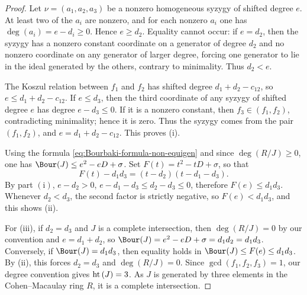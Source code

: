 \documentclass[11pt]{amsart} %
\theoremstyle{definition}
\def\hht{{\rm ht}\,}
\def\hht{{\rm ht}\,}
\begin{document}
\begin{proof}
Let $\nu=(a_1,a_2,a_3)$ be a nonzero homogeneous syzygy of shifted degree $e$. At least two of the $a_i$ are nonzero, and for each nonzero $a_i$ one has $\deg(a_i)=e-d_i\ge0$. Hence $e\ge d_2$. Equality cannot occur: if $e=d_2$, then the syzygy has a nonzero constant coordinate on a generator of degree $d_2$ and no nonzero coordinate on any generator of larger degree, forcing one generator to lie in the ideal generated by the others, contrary to minimality. Thus $d_2<e$.

The Koszul relation between $f_1$ and $f_2$ has shifted degree $d_1+d_2-c_{12}$, so $e\le d_1+d_2-c_{12}$. If $e\le d_3$, then the third coordinate of any syzygy of shifted degree $e$ has degree $e-d_3\le0$. If it is a nonzero constant, then $f_3\in(f_1,f_2)$, contradicting minimality; hence it is zero. Thus the syzygy comes from the pair $(f_1,f_2)$, and $e=d_1+d_2-c_{12}$. This proves \rm(i).

Using the formula \eqref{eq:Bourbaki-formula-non-equigen} and since $\deg(R/J)\ge0$, one has $\Bour(J)\le e^2-eD+\sigma$. Set $F(t)=t^2-tD+\sigma$, so that
$$
F(t) - d_1 d_3 = (t-d_2)(t-d_1-d_3).
$$
By part $\mathrm{(i)}$, $e-d_2 > 0$, $e-d_1-d_3 \leq d_2 - d_3 \leq 0$, therefore $F(e) \leq d_1d_3$. Whenever $d_2 < d_3$, the second factor is strictly negative, so $F(e) < d_1 d_3$, and this shows \rm(ii).

For \rm(iii), if $d_2=d_3$ and $J$ is a complete intersection, then $\deg(R/J)=0$ by our convention and $e=d_1+d_2$, so $\Bour(J)=e^2-eD+\sigma=d_1d_2=d_1d_3$. Conversely, if $\Bour(J)=d_1d_3$, then equality holds in $\Bour(J)\le F(e)\le d_1d_3$. By \rm(ii), this forces $d_2=d_3$ and $\deg(R/J)=0$. Since $\gcd(f_1,f_2,f_3)=1$, our degree convention gives $\hht(J)=3$. As $J$ is generated by three elements in the Cohen--Macaulay ring $R$, it is a complete intersection.


\end{proof}
\end{document}
